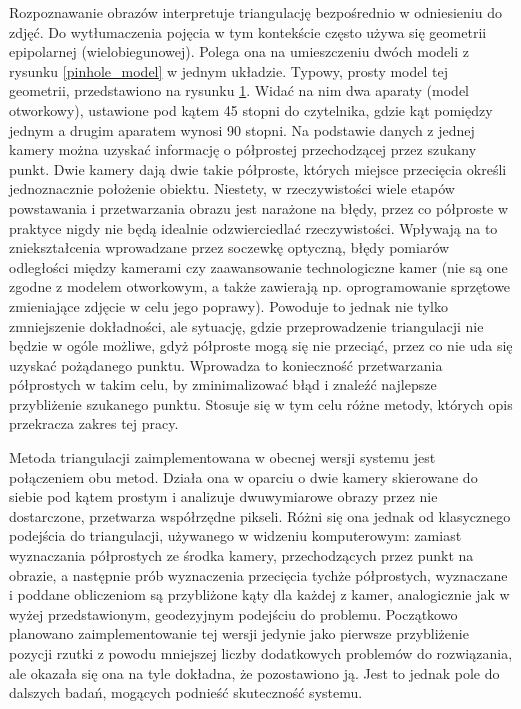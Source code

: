 Rozpoznawanie obrazów interpretuje triangulację bezpośrednio w odniesieniu do zdjęć. Do wytłumaczenia pojęcia w tym kontekście często używa się geometrii epipolarnej (wielobiegunowej). Polega ona na umieszczeniu dwóch modeli z rysunku \ref{pinhole_model} w jednym układzie. Typowy, prosty model tej geometrii, przedstawiono na rysunku \ref{epipolar}. Widać na nim dwa aparaty (model otworkowy), ustawione pod kątem 45 stopni do czytelnika, gdzie kąt pomiędzy jednym a drugim aparatem wynosi 90 stopni. Na podstawie danych z jednej kamery można uzyskać informację o półprostej przechodzącej przez szukany punkt. Dwie kamery dają dwie takie półproste, których miejsce przecięcia określi jednoznacznie położenie obiektu. Niestety, w rzeczywistości wiele etapów powstawania i przetwarzania obrazu jest narażone na błędy, przez co półproste w praktyce nigdy nie będą idealnie odzwierciedlać rzeczywistości. Wpływają na to zniekształcenia wprowadzane przez soczewkę optyczną, błędy pomiarów odległości między kamerami czy zaawansowanie technologiczne kamer (nie są one zgodne z modelem otworkowym, a także zawierają np. oprogramowanie sprzętowe zmieniające zdjęcie w celu jego poprawy). Powoduje to jednak nie tylko zmniejszenie dokładności, ale sytuację, gdzie przeprowadzenie triangulacji nie będzie w ogóle możliwe, gdyż półproste mogą się nie przeciąć, przez co nie uda się uzyskać pożądanego punktu. Wprowadza to konieczność przetwarzania półprostych w takim celu, by zminimalizować błąd i znaleźć najlepsze przybliżenie szukanego punktu. Stosuje się w tym celu różne metody, których opis przekracza zakres tej pracy.

\begin{figure}[h!]
\begin{center}

\end{center}
\label{epipolar}
\end{figure} 

Metoda triangulacji zaimplementowana w obecnej wersji systemu jest połączeniem obu metod. Działa ona w oparciu o dwie kamery skierowane do siebie pod kątem prostym i analizuje dwuwymiarowe obrazy przez nie dostarczone, przetwarza współrzędne pikseli. Różni się ona jednak od klasycznego podejścia do triangulacji, używanego w widzeniu komputerowym: zamiast wyznaczania półprostych ze środka kamery, przechodzących przez punkt na obrazie, a następnie prób wyznaczenia przecięcia tychże półprostych, wyznaczane i poddane obliczeniom są przybliżone kąty dla każdej z kamer, analogicznie jak w wyżej przedstawionym, geodezyjnym podejściu do problemu. Początkowo planowano zaimplementowanie tej wersji jedynie jako pierwsze przybliżenie pozycji rzutki z powodu mniejszej liczby dodatkowych problemów do rozwiązania, ale okazała się ona na tyle dokładna, że pozostawiono ją. Jest to jednak pole do dalszych badań, mogących podnieść skuteczność systemu.


